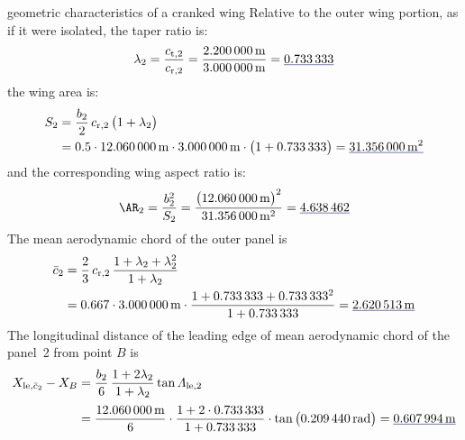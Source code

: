 \documentclass[[12pt,twoside]{book}
\begin{document}
\begin{myExampleX}{geometric characteristics of a cranked wing}{}
Relative to the outer wing portion, as if it were isolated,
the taper ratio is:
\[
\lambda_2
  =\frac{c_{\mathrm{t},2}}{c_{\mathrm{r},2}}
  =\frac{\SI[round-precision=2]{\myChordTipWingIIMT}{\metre}}{\SI[round-precision=2]{\myChordRootWingIIMT}{\metre}}
  =\mathunderline{mydarkblue}{ \SI[round-precision=2]{\myTaperRatioWingII}{} }
\]
the wing area is:
\[
\begin{split}
S_2 & {}= \frac{b_2}{2} \, c_{\mathrm{r},2} \, \big( 1 + \lambda_2 \big) \\
  & {}=
    \num{0.5} \cdot \SI[round-precision=1]{\mySpanWingIIMT}{\metre}
      \cdot \SI[round-precision=2]{\myChordRootWingIIMT}{\metre}
      \cdot \big( 1 + \SI[round-precision=2]{\myTaperRatioWingII}{} \big) 
    = \mathunderline{mydarkblue}{ \SI[round-precision=1]{\myAreaWingIIMTsquared}{\metre^2} }
\end{split}
\]
and the corresponding wing aspect ratio is:
\[
\AR_2 
  = \frac{b_2^2}{S_2}
  = \frac{\big(\SI[round-precision=1]{\mySpanWingIIMT}{\metre}\big)^2}{\SI[round-precision=1]{\myAreaWingIIMTsquared}{\metre^2}}
  = \mathunderline{mydarkblue}{ \num[round-precision=2]{\myAspectRatioWingII} }
\]
%
The mean aerodynamic chord of the outer panel is
\[
\begin{split}
\bar{c}_2 & {}= \frac{2}{3} \, c_{\mathrm{r},2} \, \frac{1+\lambda_2 + \lambda_2^2}{1+\lambda_2} \\
  & {}=
    \num{0.667} \cdot \SI[round-precision=2]{\myChordRootWingIIMT}{\metre}
      \cdot 
        \frac{
          1 + \SI[round-precision=2]{\myTaperRatioWingII}{} + \SI[round-precision=2]{\myTaperRatioWingII}{}^2
        }{
          1 + \SI[round-precision=2]{\myTaperRatioWingII}{}
        }
    = \mathunderline{mydarkblue}{ \SI[round-precision=2]{\myMACWingIIMT}{\metre} }
\end{split}
\]
%
The longitudinal distance of the leading edge of mean aerodynamic chord of the panel~2 from
point $B$ is
\[
\begin{split}
X_{\mathrm{le},\bar{c}_2} - X_B
  & {}=
    \frac{b_2}{6} \, \frac{1+2\lambda_2}{1+\lambda_2} \tan\Lambda_\mathrm{le,2} \\[3pt]
  & {}=
    \frac{\SI[round-precision=1]{\mySpanWingIIMT}{\metre}}{6}
      \cdot 
      \frac{
        1 + 2\cdot\SI[round-precision=2]{\myTaperRatioWingII}{}
      }{
        1 + \SI[round-precision=2]{\myTaperRatioWingII}{}
      }
      \cdot \tan \big( \SI[round-precision=3]{\mySweepLEWingIIRAD}{\radian} \big)
    = \mathunderline{mydarkblue}{ \SI[round-precision=2]{\myXMACLEToApexWingIIMT}{\metre} }

\end{split}\]
\end{myExampleX}
\end{document}
